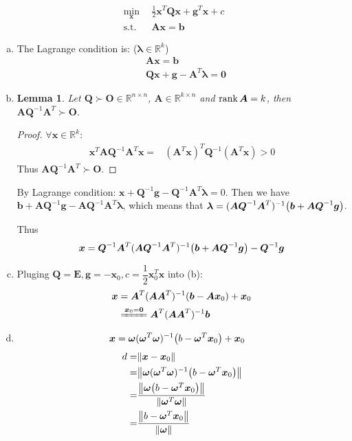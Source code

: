 \documentclass{article}
\def\RR{\mathbb{R}}
\def\bw{\boldsymbol{\omega}}
\def\bb{\boldsymbol{b}}
\def\bg{\boldsymbol{g}}
\def\bx{\boldsymbol{x}}
\def\bA{\boldsymbol{A}}
\def\bE{\boldsymbol{E}}
\def\bO{\boldsymbol{O}}
\def\bQ{\boldsymbol{Q}}
\newtheorem{lemma}{Lemma}
\begin{document}
\[
    \begin{aligned}
		\min_{\bx}\ \ 
		&\frac{1}{2}\bx^T\bQ\bx+\bg^T\bx+c
		\\\mbox{s.t.   }&
		\bA\bx=\bb
    \end{aligned}
\]
\begin{enumerate}[(a)]
	\item
		The Lagrange condition is: ($\boldsymbol{\lambda}\in\RR^k$)
		\[
		    \begin{aligned}
		       &\bA\bx=\bb
			   \\&
			   \bQ\bx+\bg-\bA^T\boldsymbol{\lambda}=\boldsymbol{0}
		    \end{aligned}
		\]
	\item
		\begin{lemma}
			Let $\bQ\succ\bO\in\RR^{n\times n}$, $\bA\in\RR^{k\times n}$ and $\rank\bA=k$, then $\bA\bQ^{-1}\bA^T\succ\bO$.
		\end{lemma}

		\begin{proof}
			$\forall \bx\in\RR^k$:
		    \[
		        \begin{aligned}
					\bx^T\bA\bQ^{-1}\bA^T\bx
					=&
					(\bA^T\bx)^T\bQ^{-1}(\bA^T\bx)>0
		        \end{aligned}
		    \]
			Thus $\bA\bQ^{-1}\bA^T\succ\bO$.
		\end{proof}
		
		By Lagrange condition:
		$\bx+\bQ^{-1}\bg-\bQ^{-1}\bA^T\boldsymbol{\lambda}=0$.
		Then we have 
		$\bb+\bA\bQ^{-1}\bg-\bA\bQ^{-1}\bA^T\boldsymbol{\lambda}$, which means that 
		$\boldsymbol{\lambda}=(\bA\bQ^{-1}\bA^T)^{-1}\qty(\bb+\bA\bQ^{-1}\bg)$.
		
		Thus
		\begin{equation*}
			\bx=\bQ^{-1}\bA^T(\bA\bQ^{-1}\bA^T)^{-1}\qty(\bb+\bA\bQ^{-1}\bg)-\bQ^{-1}\bg
		\end{equation*}
		\newpage
	\item
		Pluging $\bQ=\bE,\bg=-\bx_0,c=\dfrac{1}{2}\bx_0^T\bx$ into (b):
		\[
		    \begin{aligned}
		        \bx&=\bA^T(\bA\bA^T)^{-1}\qty(\bb-\bA\bx_0)+\bx_0
				\\ &\xlongequal{\bx_0=\boldsymbol{0}}
				\bA^T(\bA\bA^T)^{-1}\bb
		    \end{aligned}
		\]
	\item
		\[
		    \begin{aligned}
		        \bx&=\bw(\bw^T\bw)^{-1}\qty(b-\bw^T\bx_0)+\bx_0
		    \end{aligned}
		\]
		\[
		    \begin{aligned}
				d=&\norm{\bx-\bx_0}
				\\=&
				\norm{\bw(\bw^T\bw)^{-1}\qty(b-\bw^T\bx_0)}
				\\=&
				\frac{\norm{\bw\qty(b-\bw^T\bx_0)}}{\norm{\bw^T\bw}}
				\\=&
				\frac{\norm{b-\bw^T\bx_0}}{\norm{\bw}}
		    \end{aligned}
		\]
\end{enumerate}
\end{document}
